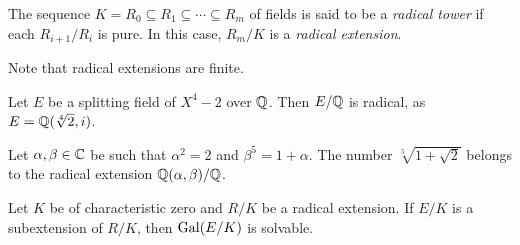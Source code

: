 \begin{definition}
    The sequence $K=R_0\subseteq R_1\subseteq\cdots\subseteq R_m$ 
    of fields is said to be a \emph{radical tower} if 
    each $R_{i+1}/R_i$ is pure. In this case, $R_m/K$ is a \emph{radical extension}. 
\end{definition}

Note that radical extensions are finite. 

\begin{example}
    Let $E$ be a splitting field of $X^4-2$ over $\mathbb{Q}$. Then $E/\mathbb{Q}$ is radical, 
    as $E=\mathbb{Q}(\sqrt[4]{2},i)$. 
\end{example}

\begin{example}
    Let $\alpha,\beta\in\mathbb{C}$ be such that $\alpha^2=2$ and 
    $\beta^5=1+\alpha$. 
    The number $\sqrt[5]{1+\sqrt{2}}$ belongs to the radical extension $\mathbb{Q}(\alpha,\beta)/\mathbb{Q}$. 
\end{example}

\begin{theorem}
\label{thm:by_radicals}
    Let $K$ be of characteristic zero and 
    $R/K$ be a radical extension. If $E/K$ is a subextension of $R/K$, 
    then $\operatorname{Gal}(E/K)$ is solvable. 
\end{theorem}

